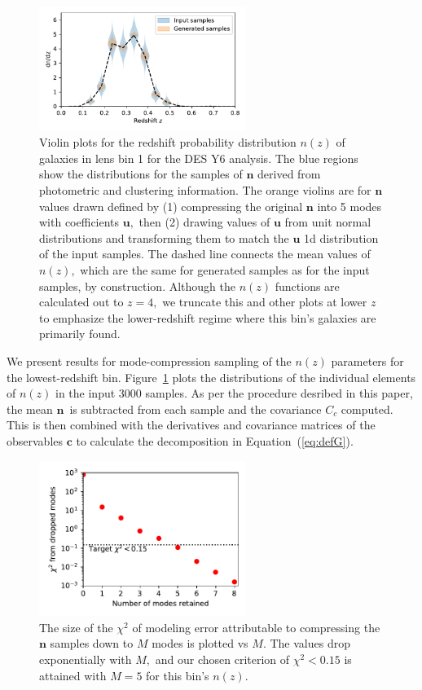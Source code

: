 \documentclass[linenumbers, onecolumn]{aastex63}
\newcommand{\eqq}[1]{Equation~(\ref{#1})}
\newcommand{\vecc}{\ensuremath{\mathbf{c}}}
\newcommand{\vecn}{\ensuremath{\mathbf{n}}}
\newcommand{\vecu}{\ensuremath{\mathbf{u}}}
\newcommand{\covm}{C}
\begin{document}
\begin{figure}
  \center
  \includegraphics[width=0.6\textwidth]{violin.pdf}
\caption{Violin plots for the redshift probability distribution $n(z)$
  of galaxies in lens bin 1 for the DES Y6 analysis.  The blue regions
  show the distributions for the samples of $\vecn$ derived from
  photometric and clustering information.  The orange violins are for
  $\vecn$ values drawn defined by (1) compressing the original $\vecn$
  into 5 modes with coefficients $\vecu,$ then (2) drawing values of
  $\vecu$ from unit normal distributions and transforming them to
  match the $\vecu$ 1d distribution of the input samples.  The dashed
  line connects the mean values of $n(z),$ which are the same for
  generated samples as for the input samples, by construction.
  Although the $n(z)$ functions are calculated out to $z=4,$ we
  truncate this and other plots at lower $z$ to emphasize the
  lower-redshift regime where this bin's galaxies are primarily found.}
  \label{fig:violins}
\end{figure}

We present results for mode-compression sampling of the $n(z)$
parameters for the lowest-redshift bin.  Figure~\ref{fig:violins}
plots the distributions of the individual elements of $n(z)$ in the
input 3000 samples.  As per the procedure desribed in this paper, the
mean \vecn\ is subtracted from each sample and the covariance
$\covm_c$ computed.  This is then combined with the
derivatives and covariance matrices of the observables $\vecc$ to
calculate the decomposition in \eqq{eq:defG}.

\begin{figure}
  \center
  \includegraphics[width=0.6\textwidth]{chiresids.pdf}
\caption{The size of the $\chi^2$ of modeling error attributable to compressing the
  $\vecn$ samples down to $M$ modes is plotted vs $M$.  The values
  drop exponentially with $M,$ and our chosen criterion of
  $\chi^2<0.15$ is attained with $M=5$ for this bin's $n(z).$}
  \label{fig:chiresid}
\end{figure}
\end{document}
